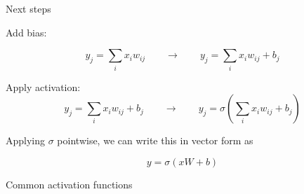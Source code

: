 \begin{frame}{Next steps}

    Add bias:

    \begin{equation*}
        y_j = \sum_i x_i w_{ij}       
        \qquad \to \qquad
        y_j = \sum_i x_i w_{ij} + b_j
    \end{equation*}

    Apply activation:
    \begin{equation*}
        y_j = \sum_i x_i w_{ij} + b_j
        \qquad \to \qquad
        y_j = \sigma \left(\sum_i x_i w_{ij} + b_j \right)
    \end{equation*}

    Applying $\sigma$ pointwise, we can write this in vector form as
    
    \begin{equation*}
        y = \sigma(x W + b)
    \end{equation*}

    
\end{frame}

\begin{frame}{Common activation functions}
    
    \begin{figure}
       \centering
    \end{figure}

\end{frame}


